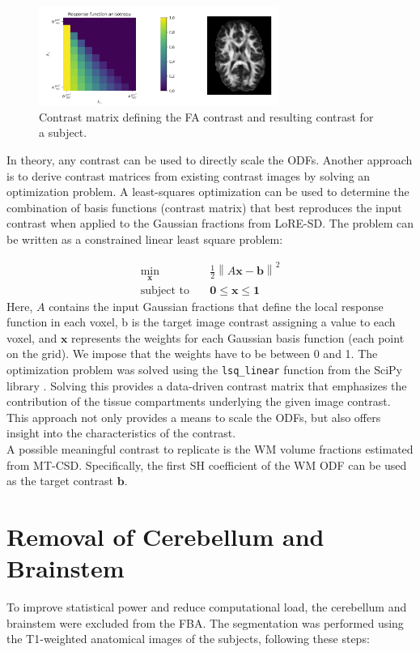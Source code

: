 \begin{figure}[h]
  \centering
  \includegraphics[width=0.7\textwidth]{Images/fa.png} %
  \caption{Contrast matrix defining the FA contrast and resulting contrast for a subject.}
  \label{fig:fa}
\end{figure}
 

In theory, any contrast can be used to directly scale the ODFs. Another approach is to derive contrast matrices from existing contrast images by solving an optimization problem. A least-squares optimization can be used to determine the combination of basis functions (contrast matrix) that best reproduces the input contrast when applied to the Gaussian fractions from LoRE-SD. The problem can be written as a constrained linear least square problem:

\begin{align}
\min_{\boldsymbol{x}} \quad & \frac{1}{2} \left\| A \boldsymbol{x} - \boldsymbol{b} \right\|^2 \\
\text{subject to} \quad & \boldsymbol{0} \leq \boldsymbol{x} \leq \boldsymbol{1}
\end{align}
Here, $A$ contains the input Gaussian fractions that define the local response function in each voxel, b is the target image contrast assigning a value to each voxel, and $\boldsymbol{x}$ represents the weights for each Gaussian basis function (each point on the grid). We impose that the weights have to be between 0 and 1. The optimization problem was solved using the \texttt{lsq\_linear} function from the SciPy library \cite{Virtanen2020}.
Solving this provides a data-driven contrast matrix that emphasizes the contribution of the tissue compartments underlying the given image contrast. This approach not only provides a means to scale the ODFs, but also offers insight into the characteristics of the contrast.
\\A possible meaningful contrast to replicate is the WM volume fractions estimated from MT-CSD. Specifically, the first SH coefficient of the WM ODF can be used as the target contrast $\boldsymbol{b}$.

\section{Removal of Cerebellum and Brainstem}
To improve statistical power and reduce computational load, the cerebellum and brainstem were excluded from the FBA. The segmentation was performed using the T1-weighted anatomical images of the subjects, following these steps:

